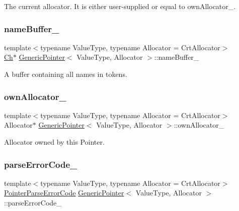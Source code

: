The current allocator. It is either user-\/supplied or equal to own\+Allocator\+\_\+. 

\mbox{\label{classGenericPointer_a2fd627c663483ad08e4f26707ea5ad86}} 
\subsubsection{\texorpdfstring{name\+Buffer\+\_\+}{nameBuffer\_}}
{\footnotesize\ttfamily template$<$typename Value\+Type, typename Allocator = Crt\+Allocator$>$ \\
\hyperlink{classGenericPointer_ab292356c11b4015c98d21b966b11f285}{Ch}$\ast$ \hyperlink{classGenericPointer}{Generic\+Pointer}$<$ Value\+Type, Allocator $>$\+::name\+Buffer\+\_\+}



A buffer containing all names in tokens. 

\mbox{\label{classGenericPointer_a99b51c07419ee17d57e97774d8ee63ab}} 
\subsubsection{\texorpdfstring{own\+Allocator\+\_\+}{ownAllocator\_}}
{\footnotesize\ttfamily template$<$typename Value\+Type, typename Allocator = Crt\+Allocator$>$ \\
Allocator$\ast$ \hyperlink{classGenericPointer}{Generic\+Pointer}$<$ Value\+Type, Allocator $>$\+::own\+Allocator\+\_\+}



Allocator owned by this Pointer. 

\mbox{\label{classGenericPointer_a8898ec432dc40b28f79db78dc4ca83e0}} 
\subsubsection{\texorpdfstring{parse\+Error\+Code\+\_\+}{parseErrorCode\_}}
{\footnotesize\ttfamily template$<$typename Value\+Type, typename Allocator = Crt\+Allocator$>$ \\
\hyperlink{group__RAPIDJSON__ERRORS_gacb2e274f33e54d91b96e9883a99a98be}{Pointer\+Parse\+Error\+Code} \hyperlink{classGenericPointer}{Generic\+Pointer}$<$ Value\+Type, Allocator $>$\+::parse\+Error\+Code\+\_\+}



